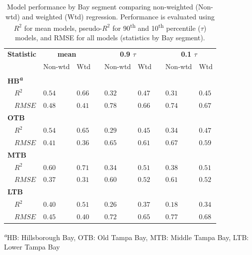 \documentclass{svjour3}\usepackage[]{graphicx}\usepackage[]{color}
\newcommand{\ten}{10\textsuperscript{th} percentile }
\begin{document}
\begin{table}[!tbp]
\caption{Model performance by Bay segment comparing non-weighted (Non-wtd) and weighted (Wtd) regression.  Performance is evaluated using $R^2$ for mean models, pseudo-$R^2$ for 90\textsuperscript{th} and \ten ($\tau$) models, and \ac{RMSE} for all models (statistics by Bay segment).\label{tab:modperf}} 
\begin{center}
\begin{tabular}{lllcllcll}
\hline\hline
\multicolumn{1}{l}{\bfseries Statistic}&\multicolumn{2}{c}{\bfseries mean}&\multicolumn{1}{c}{\bfseries }&\multicolumn{2}{c}{\bfseries 0.9 $\tau$}&\multicolumn{1}{c}{\bfseries }&\multicolumn{2}{c}{\bfseries 0.1 $\tau$}\tabularnewline
\cline{2-3} \cline{5-6} \cline{8-9}
\multicolumn{1}{l}{}&\multicolumn{1}{c}{Non-wtd}&\multicolumn{1}{c}{Wtd}&\multicolumn{1}{c}{}&\multicolumn{1}{c}{Non-wtd}&\multicolumn{1}{c}{Wtd}&\multicolumn{1}{c}{}&\multicolumn{1}{c}{Non-wtd}&\multicolumn{1}{c}{Wtd}\tabularnewline
\hline
{\bfseries HB\textsuperscript{\textit{a}}}&&&&&&&&\tabularnewline
~~$R^2$&$0.54$&$0.66$&&$0.32$&$0.47$&&$0.31$&$0.45$\tabularnewline
~~$RMSE$&$0.48$&$0.41$&&$0.78$&$0.66$&&$0.74$&$0.67$\tabularnewline
\hline
{\bfseries OTB}&&&&&&&&\tabularnewline
~~$R^2$&$0.54$&$0.65$&&$0.29$&$0.45$&&$0.34$&$0.47$\tabularnewline
~~$RMSE$&$0.41$&$0.36$&&$0.65$&$0.61$&&$0.67$&$0.59$\tabularnewline
\hline
{\bfseries MTB}&&&&&&&&\tabularnewline
~~$R^2$&$0.60$&$0.71$&&$0.34$&$0.51$&&$0.38$&$0.51$\tabularnewline
~~$RMSE$&$0.37$&$0.31$&&$0.60$&$0.52$&&$0.61$&$0.52$\tabularnewline
\hline
{\bfseries LTB}&&&&&&&&\tabularnewline
~~$R^2$&$0.40$&$0.51$&&$0.26$&$0.37$&&$0.18$&$0.34$\tabularnewline
~~$RMSE$&$0.45$&$0.40$&&$0.72$&$0.65$&&$0.77$&$0.68$\tabularnewline
\hline
\end{tabular}\end{center}

\footnotesize \textsuperscript{\textit{a}}HB: Hillsborough Bay, OTB: Old Tampa Bay, MTB: Middle Tampa Bay, LTB: Lower Tampa Bay\end{table}
\end{document}
